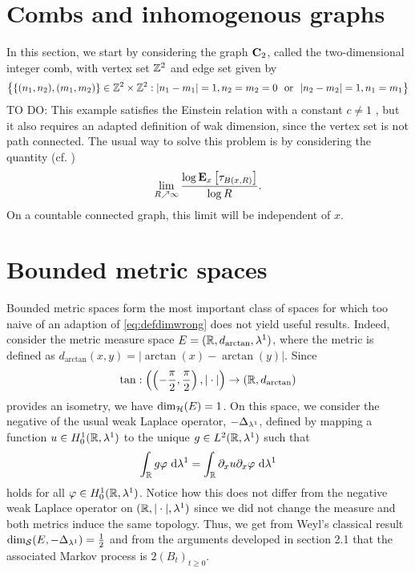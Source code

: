 \newpage

\section{Combs and inhomogenous graphs}

In this section, we start by considering the graph $\bC_2$, called the two-dimensional integer comb, with vertex set $\IZ^2$ and edge set given by
\[
  \left\{\{(n_1,n_2),(m_1,m_2)\}\in\IZ^2\times\IZ^2:|n_1-m_1|=1,n_2=m_2=0\ \text{ or }\ |n_2-m_2|=1,n_1=m_1\right\}
\]
TO DO: This example satisfies the Einstein relation with a constant $c\neq1$ \cite{bertacchi2006}, but it also requires an adapted definition of wak dimension, since the vertex set is not path connected. The usual way to solve this problem is by considering the quantity (cf. \cite{freiberg2012einstein})
\begin{equation}\label{eq:defdimwrong}
  \lim_{R\nearrow\infty}\frac{\log \PTEp{\tau_{B(x,R)}}{x}}{\log R}.
\end{equation}
On a countable connected graph, this limit will be independent of $x$. 


\section{Bounded metric spaces}

Bounded metric spaces form the most important class of spaces for which too naive of an adaption of \eqref{eq:defdimwrong} does not yield useful results. Indeed, consider the metric measure space 
$E=(\IR,d_{\arctan},\gl^1)$, where the metric is defined as $d_{\arctan}(x,y)=|\arctan(x)-\arctan(y)|$. Since 
\[
  \tan:\left(\left(-\frac{\pi}{2},\frac{\pi}{2}\right),|\cdot|\right)\to(\IR,d_{\arctan}) 
\]
provides an isometry, we have $\dimh(E)=1$. On this space, we consider the negative of the usual weak Laplace operator, $-\gD_{\gl^1}$, defined by mapping a function $u\in H_0^1(\IR,\gl^1)$ to the unique $g\in L^2(\IR,\gl^1)$ such that
\[
  \int_\IR g\gp\,\Di\gl^1=\int_\IR \partial_x u\partial_x \gp\,\Di\gl^1
\]
holds for all $\gp\in H_0^1(\IR,\gl^1)$. Notice how this does not differ from the negative weak Laplace operator on $(\IR,|\cdot|,\gl^1)$ since we did not change the measure and both metrics induce the same topology. Thus, we get from Weyl's classical result $\dims(E,-\gD_{\gl^1})=\frac{1}{2}$ and from the arguments developed in section 2.1 that the associated Markov process is $2(B_t)_{t\geq0}$. 

